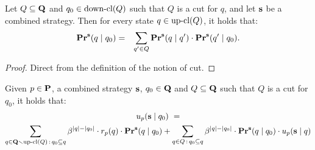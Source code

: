 \begin{mylem}\label{lem-cut}
Let $Q \subseteq \mathbf{Q}$ and $q_0 \in \text{\rm down-cl}(Q)$ such that $Q$ is a cut for $q$, and let $\mathbf{s}$ be a combined strategy. Then for every state $q \in \text{\rm up-cl}(Q)$, it holds that:
\begin{eqnarray*}
\mathbf{Pr}^{\mathbf{s}}(q \mid q_0) & = & \sum_{q' \in Q} \mathbf{Pr}^{\mathbf{s}}(q \mid q') \cdot \mathbf{Pr}^{\mathbf{s}}(q' \mid q_0).
\end{eqnarray*}
\end{mylem}

\begin{proof}
Direct from the definition of the notion of cut.
\end{proof}

\begin{mylem}\label{lem-cut-utility}
Given $p \in \mathbf{P}$, a combined strategy $\mathbf{s}$, $q_0 \in \mathbf{Q}$ and $Q \subseteq \mathbf{Q}$ such that $Q$ is a cut for $q_0$, it holds that:
\begin{multline*}
u_p(\mathbf{s} \mid q_0) \ = \\
\sum_{q \in \mathbf{Q} \smallsetminus \text{\rm up-cl}(Q)\,:\, q_0 \subseteq q} \beta^{|q|-|q_0|} \cdot r_p(q) \cdot \mathbf{Pr}^{\mathbf{s}}(q \mid q_0) + 
\sum_{q \in Q \,:\, q_0 \subseteq q} \beta^{|q|-|q_0|} \cdot \mathbf{Pr}^{\mathbf{s}}(q \mid q_0) \cdot u_p(\mathbf{s} \mid q)
\end{multline*}
\end{mylem}

